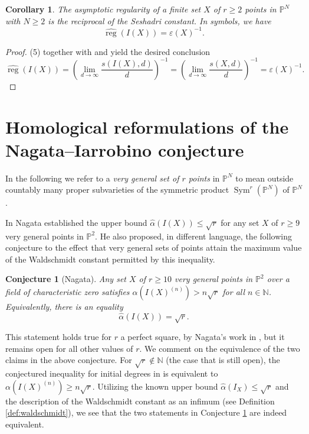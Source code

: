 \documentclass[12pt, reqno]{amsart}
\numberwithin{equation}{section}
\def\e{\ensuremath{\varepsilon}}
\newcommand{\wa}{\widehat{\alpha}}
\newcommand{\N}{{\mathbb N}}
\renewcommand{\P}{{\mathbb P}}
\DeclareMathOperator{\reg}{reg}
\DeclareMathOperator{\Sym}{Sym}
\theoremstyle{plain} %
\newtheorem{cor}[thm]{Corollary}
\newtheorem{conj}[thm]{Conjecture}
\theoremstyle{definition}
\theoremstyle{remark}
\begin{document}
\begin{cor}
\label{thm:areg}
The asymptotic regularity of a finite set $X$ of $r\geq 2$ points in $\P^N$ with $N\geq 2$ is the reciprocal of the Seshadri constant. In symbols, we have
\[
\widehat{\reg}(I(X))=\e(X)^{-1}.
\]
\end{cor}
\begin{proof}
 (5) together with  and  yield the desired conclusion
\[
\widehat{\reg}(I(X))= \left(\lim_{d\to\infty} \frac{s(I(X),d)}{d}\right)^{-1}= \left(\lim_{d\to\infty} \frac{s(X,d)}{d}\right)^{-1}=\e(X)^{-1}.
\]
\end{proof}

\section{Homological reformulations of the Nagata--Iarrobino conjecture}
\label{s:Nagata}
In the following we refer to a {\em very general set of $r$ points} in $\P^N$ to mean outside countably many proper subvarieties of the symmetric product $\Sym^r(\P^N)$ of $\P^N$.

In \cite{Nagata59} Nagata  established the upper bound $\widehat{\alpha}(I(X))\leq \sqrt{r}$ for any set $X$ of $r\geq 9$ very general points in $\P^2$. He also proposed, in different language, the following conjecture to the effect that very general sets of points attain  the maximum value of the Waldschmidt constant permitted by this inequality.  

\begin{conj}[Nagata]
\label{conj:Nag}
Any set $X$ of $r\geq 10 $ very general points in $\P^2$ over a field of characteristic zero satisfies  
$\alpha(I(X)^{(n)})> n\sqrt{r}$  for all $n\in\N$.
Equivalently, there is an equality 
\[
\wa(I(X))=\sqrt{r}.
\]
\end{conj}
 
This statement holds true for $r$ a perfect square, by Nagata's work in  \cite{Nagata59}, but it remains open for
all other values of $r$. We comment on the equivalence of the two claims in the above conjecture. For $\sqrt{r} \not \in\N$ (the case that is still open), the conjectured inequality for initial degrees in   is equivalent to $\alpha(I(X)^{(n)})\geq n\sqrt{r}$.
Utilizing the known upper bound $\widehat{\alpha}(I_X)\leq \sqrt{r}$ and the description of the Waldschmidt constant as an infimum (see Definition \ref{def:waldschmidt}), we see that the two statements in Conjecture \ref{conj:Nag} are indeed equivalent.  
\end{document}
